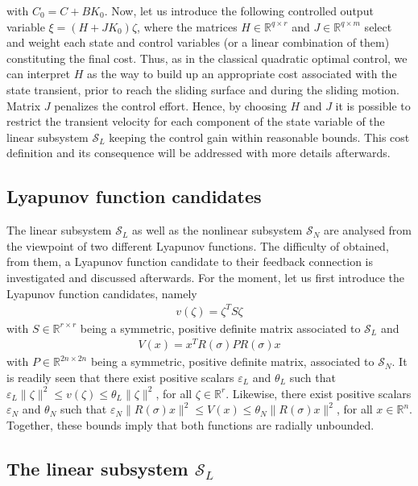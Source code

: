 \documentclass[twocolumn]{autarc_LH}
\newcommand{\Rf}{{\mathbb R}}
\begin{document}
with $C_{0} = C + B K_0$. Now, let us introduce the following controlled output variable $ \xi = (H + J K_0) \zeta$, where the matrices $H \in \Rf^{q \times r}$ and $J \in \Rf^{q \times m}$ select and weight each state and control variables (or a linear combination of them) constituting the final cost. Thus, as in the classical quadratic optimal control, we can interpret $H$ as the way to build up an appropriate cost associated with the state transient, prior to reach the sliding surface and during the sliding motion. Matrix $J$ penalizes the control effort. Hence, by choosing $H$ and $J$ it is possible to restrict the transient velocity for each component of the state variable of the linear subsystem $\mathcal{S}_L$ keeping the control gain within reasonable bounds. This cost definition and its consequence will be addressed with more details afterwards. 

\subsection{Lyapunov function candidates}

The linear subsystem $\mathcal{S}_L$ as well as the nonlinear subsystem $\mathcal{S}_{N}$ are analysed from the viewpoint of two different Lyapunov functions. The difficulty of obtained, from them, a Lyapunov function candidate to their feedback connection is investigated and discussed afterwards. For the moment, let us first introduce the Lyapunov function candidates, namely 
\begin{align}
	\label{eq27}  v(\zeta) = \zeta^T S \zeta 
\end{align}
with $S \in \Rf^{r \times r}$ being a symmetric, positive definite matrix associated to $\mathcal{S}_L$ and 
\begin{align}
	\label{eq28}  V(x) = x^TR(\sigma) P R(\sigma) x
\end{align}
with $P \in \Rf^{2n \times 2n}$ being a symmetric, positive definite matrix, associated to $\mathcal{S}_N$. It is readily seen that there exist positive scalars $\varepsilon_L$ and $\theta_L$ such that $\varepsilon_L \|\zeta\|^2 \leq v(\zeta) \leq \theta_L \|\zeta\|^2$, for all $\zeta \in \Rf^r$. Likewise, there exist positive scalars $\varepsilon_N$ and $\theta_N$ such that $\varepsilon_N \|R(\sigma) x\|^2 \leq V(x) \leq \theta_N \|R(\sigma) x\|^2$, for all $x \in \Rf^n$. Together, these bounds imply that both functions are radially unbounded.

\subsection{The linear subsystem $\mathcal{S}_L$}
\end{document}
